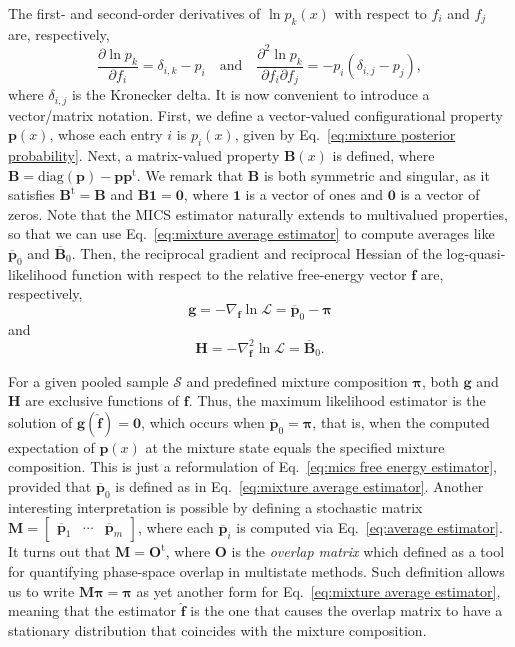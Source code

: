\documentclass[journal=jctcce,manuscript=article]{achemso}
\newcommand{\mt}[1]{\boldsymbol{\mathbf{#1}}}   %
\newcommand{\vt}[1]{\boldsymbol{\mathbf{#1}}}   %
\newcommand{\tr}[1]{#1^\text{t}}                %
\newcommand{\avg}[1]{\overline{#1}}             %
\begin{document}
The first- and second-order derivatives of $\ln p_k(x)$ with respect to $f_i$ and $f_j$ are, respectively,
\begin{equation*}
\frac{\partial \ln p_k}{\partial f_i} = \delta_{i,k} - p_i
\quad \text{and} \quad
\frac{\partial^2\ln p_k}{\partial f_i \partial f_j} = -p_i(\delta_{i,j} - p_j),
\end{equation*}
where $\delta_{i,j}$ is the Kronecker delta. It is now convenient to introduce a vector/matrix notation. First, we define a vector-valued configurational property $\vt p(x)$, whose each entry $i$ is $p_i(x)$, given by Eq.~\eqref{eq:mixture posterior probability}. Next, a matrix-valued property $\mt B(x)$ is defined, where $\mt B = \text{diag}(\vt p) - {\vt p}\tr{\vt p}$. We remark that $\mt B$ is both symmetric and singular, as it satisfies $\tr{\mt B} = \mt B$ and $\mt B\vt 1 = \vt 0$, where $\vt 1$ is a vector of ones and $\vt 0$ is a vector of zeros. Note that the MICS estimator naturally extends to multivalued properties, so that we can use Eq.~\eqref{eq:mixture average estimator} to compute averages like $\avg{\vt p}_0$ and $\avg{\mt B}_0$. Then, the reciprocal gradient and reciprocal Hessian of the log-quasi-likelihood function with respect to the relative free-energy vector $\vt f$ are, respectively,
\begin{equation}
\label{eq:mics score vector}
\vt g = -\nabla_{\vt f} \ln \mathcal L = \avg{\vt p}_0 - \vt \pi
\end{equation}
and
\begin{equation}
\label{eq:mics fisher information matrix}
\mt H = -\nabla^2_{\vt f} \ln \mathcal L = \avg{\mt B}_0.
\end{equation}

For a given pooled sample $\mathcal S$ and predefined mixture composition $\vt \pi$, both $\vt g$ and $\mt H$ are exclusive functions of $\vt f$. Thus, the maximum likelihood estimator is the solution of $\vt g(\hat{\vt f}) = \vt 0$, which occurs when $\avg{\vt p}_0 = \vt \pi$, that is, when the computed expectation of $\vt p(x)$ at the mixture state equals the specified mixture composition. This is just a reformulation of Eq.~\eqref{eq:mics free energy estimator}, provided that $\avg{\vt p}_0$ is defined as in Eq.~\eqref{eq:mixture average estimator}. Another interesting interpretation is possible by defining a stochastic matrix $\mt M = [\begin{array}{ccc} \avg{\vt p}_1 & \cdots & \avg{\vt p}_m \end{array}]$, where each $\avg{\vt p}_i$ is computed via Eq.~\eqref{eq:average estimator}. It turns out that $\mt M = \tr{\mt O}$, where $\mt O$ is the \textit{overlap matrix} which \citeauthor{Klimovich_2015} \cite{Klimovich_2015} defined as a tool for quantifying phase-space overlap in multistate methods. Such definition allows us to write $\mt M \vt \pi = \vt \pi$ as yet another form for Eq.~\eqref{eq:mixture average estimator}, meaning that the estimator $\hat{\vt f}$ is the one that causes the overlap matrix to have a stationary distribution that coincides with the mixture composition.
\end{document}
